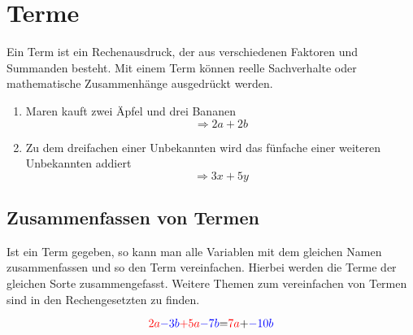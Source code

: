 \section{Terme}
Ein Term ist ein Rechenausdruck, der aus verschiedenen Faktoren und Summanden besteht. Mit einem Term können reelle Sachverhalte oder mathematische Zusammenhänge ausgedrückt werden.

\begin{beispiel}
\begin{enumerate}
	\item Maren kauft zwei Äpfel und drei Bananen
\[\Rightarrow2a+2b\]
\item Zu dem dreifachen einer Unbekannten wird das fünfache einer weiteren Unbekannten addiert
\[\Rightarrow 3x+5y\]
\end{enumerate}
\end{beispiel}

\subsection{Zusammenfassen von Termen}
Ist ein Term gegeben, so kann man alle Variablen mit dem gleichen Namen zusammenfassen und so den Term vereinfachen. Hierbei werden die Terme der gleichen Sorte zusammengefasst. Weitere Themen zum vereinfachen von Termen sind in den Rechengesetzten zu finden.

\begin{beispiel}
	\[\color{red}{2a}\color{blue}{-3b} \color{red}{+5a}\color{blue}{-7b}\color{black}{=}\color{red}{7a}\color{black}{+}\color{blue}{-10b} \]
\end{beispiel}

